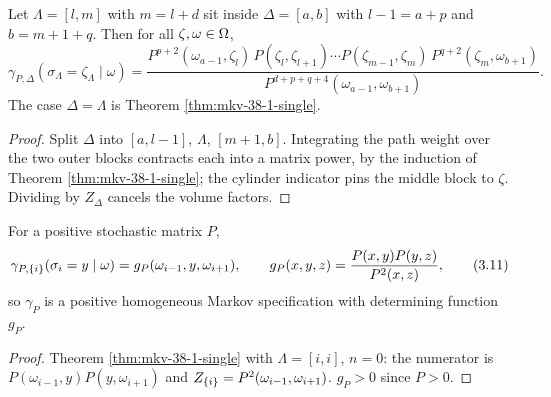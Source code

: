 \begin{theorem}
    \label{thm:mkv-38-1}
    \leanok

    Let $\Lambda = [l, m]$ with $m = l + d$ sit inside $\Delta = [a, b]$ with $l - 1 = a + p$ and
    $b = m + 1 + q$. Then for all $\zeta, \omega \in \Omega$,
    \[
        \gamma_{P,\Delta}(\sigma_\Lambda = \zeta_\Lambda \mid \omega)
          = \frac{P^{p+2}(\omega_{a-1}, \zeta_l)\, P(\zeta_l, \zeta_{l+1}) \cdots
                  P(\zeta_{m-1}, \zeta_m)\, P^{q+2}(\zeta_m, \omega_{b+1})}
                 {P^{d+p+q+4}(\omega_{a-1}, \omega_{b+1})}.
    \]
    The case $\Delta = \Lambda$ is Theorem \ref{thm:mkv-38-1-single}.
\end{theorem}
\begin{proof}
    \leanok

    Split $\Delta$ into $[a, l-1]$, $\Lambda$, $[m+1, b]$. Integrating the path weight over the
    two outer blocks contracts each into a matrix power, by the induction of Theorem
    \ref{thm:mkv-38-1-single}; the cylinder indicator pins the middle block to $\zeta$. Dividing
    by $Z_\Delta$ cancels the volume factors.
\end{proof}

\begin{theorem}
    \label{thm:mkv-311}
    \leanok

    For a positive stochastic matrix $P$,
    \[
        \gamma_{P,\left\{ i \right\}}(\sigma_i = y \mid \omega)
          = g_P(\omega_{i-1}, y, \omega_{i+1}), \qquad
        g_P(x,y,z) = \frac{P(x,y)P(y,z)}{P^2(x,z)}, \qquad (3.11)
    \]
    so $\gamma_P$ is a positive homogeneous Markov specification with determining function $g_P$.
\end{theorem}
\begin{proof}
    \leanok

    Theorem \ref{thm:mkv-38-1-single} with $\Lambda = [i,i]$, $n = 0$: the numerator is
    $P(\omega_{i-1}, y)P(y, \omega_{i+1})$ and $Z_{\left\{ i \right\}} = P^2(\omega_{i-1},\omega_{i+1})$.
    $g_P > 0$ since $P > 0$.
\end{proof}

